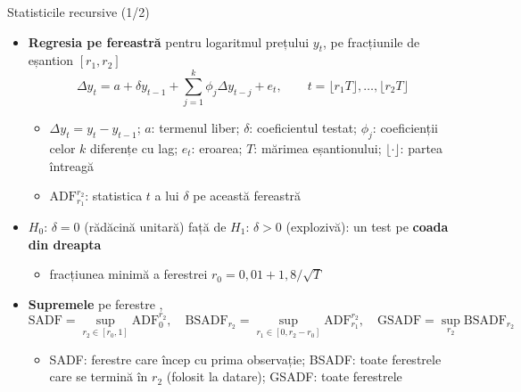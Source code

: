 \begin{frame}{Statisticile recursive (1/2)}
\itemsize{\small}
\begin{itemize}
    \item \textbf{Regresia pe fereastră} pentru logaritmul prețului $y_t$, pe fracțiunile de eșantion $[r_1, r_2]$ \[ \Delta y_t = a + \delta y_{t-1} + \sum_{j=1}^{k}\phi_j\Delta y_{t-j} + e_t, \qquad t = \lfloor r_1T\rfloor, \dots, \lfloor r_2T\rfloor \]
    \begin{itemize}
        \item $\Delta y_t = y_t - y_{t-1}$; $a$: termenul liber; $\delta$: coeficientul testat; $\phi_j$: coeficienții celor $k$ diferențe cu lag; $e_t$: eroarea; $T$: mărimea eșantionului; $\lfloor\cdot\rfloor$: partea întreagă
        \item $\mathrm{ADF}_{r_1}^{r_2}$: statistica $t$ a lui $\delta$ pe această fereastră
    \end{itemize}
    \item $H_0$: $\delta = 0$ (rădăcină unitară) față de $H_1$: $\delta > 0$ (explozivă): un test pe \textbf{coada din dreapta}
    \begin{itemize}
        \item fracțiunea minimă a ferestrei $r_0 = 0{,}01 + 1{,}8/\sqrt T$
    \end{itemize}
    \item \textbf{Supremele} pe ferestre ,  \[ \mathrm{SADF} = \sup_{r_2 \in [r_0, 1]}\mathrm{ADF}_0^{r_2}, \quad \mathrm{BSADF}_{r_2} = \sup_{r_1 \in [0, r_2 - r_0]}\mathrm{ADF}_{r_1}^{r_2}, \quad \mathrm{GSADF} = \sup_{r_2}\mathrm{BSADF}_{r_2} \]
    \begin{itemize}
        \item SADF: ferestre care încep cu prima observație; BSADF: toate ferestrele care se termină în $r_2$ (folosit la datare); GSADF: toate ferestrele
    \end{itemize}
\end{itemize}
\end{frame}

